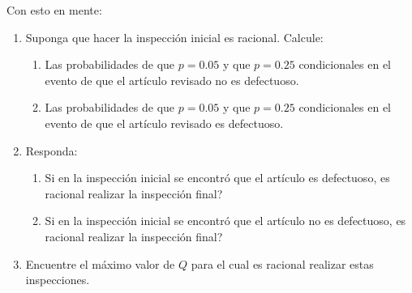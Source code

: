 \documentclass[ a4paper, twoside, 11pt]{article}
\begin{document}
\begin{problem}
Con esto en mente: 
\begin{enumerate}[label=\textbf{\alph*)}]
\item Suponga que hacer la inspecci\'on inicial es racional. Calcule: 
\begin{enumerate}[label=\textbf{\roman*)}]
\item Las probabilidades de que $p = 0.05$ y que $p = 0.25$ condicionales en el evento de que el art\'iculo revisado no es defectuoso. 
\item Las probabilidades de que $p = 0.05$ y que $p = 0.25$ condicionales en el evento de que el art\'iculo revisado es defectuoso. 
\end{enumerate}
\item Responda: 
\begin{enumerate}[label=\textbf{\roman*)}]
\item Si en la inspecci\'on inicial se encontr\'o que el art\'iculo es defectuoso, es racional realizar la inspecci\'on final? 
\item Si en la inspecci\'on inicial se encontr\'o que el art\'iculo no es defectuoso, es racional realizar la inspecci\'on final? 
\end{enumerate}
\item Encuentre el m\'aximo valor de $Q$ para el cual es racional realizar estas inspecciones. 
\end{enumerate}
\QED

\end{problem}
\vspace{\baselineskip}
\end{document}
